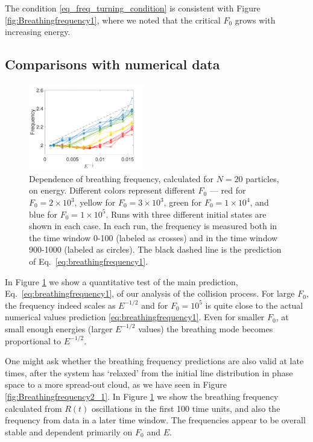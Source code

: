 \documentclass[a4paper, onecolumn]{revtex4-1}
\begin{document}
The condition \eqref{eq_freq_turning_condition} is consistent with Figure
\ref{fig:Breathingfrequency1}, where we noted that the critical $F_0$ grows with increasing energy.


\subsection{Comparisons with numerical data}


\begin{figure}[tb]
\centering
\includegraphics[width=0.45\textwidth]{N_20_freq_vs_E_a.pdf}
\caption{Dependence of breathing frequency, calculated for $N=20$ particles, on energy.  Different
  colors represent different $F_0$ --- red for $F_0=2\times10^3$, yellow for $F_0=3\times10^3$,
  green for $F_0=1\times10^4$, and blue for $F_0=1\times10^5$.  Runs with three different initial
  states are shown in each case.  In each run, the frequency is measured both in the time window
  0-100 (labeled as crosses) and in the time window 900-1000 (labeled as circles). The black dashed
  line is the prediction of Eq.~\eqref{eq:breathingfrequency1}.}
\label{fig:Breathingfrequency4}
\end{figure}


In Figure \ref{fig:Breathingfrequency4} we show a quantitative test of the main prediction,
Eq.~\eqref{eq:breathingfrequency1}, of our analysis of the collision process.  For large $F_0$, the
frequency indeed scales as $E^{-1/2}$ and for $F_0=10^5$ is quite close to the actual numerical
values prediction \eqref{eq:breathingfrequency1}.  Even for smaller $F_0$, at small enough energies
(larger $E^{-1/2}$ values) the breathing mode becomes proportional to $E^{-1/2}$.

One might ask whether the breathing frequency predictions are also valid at late times, after the
system has `relaxed' from the initial line distribution in phase space to a more spread-out cloud,
as we have seen in Figure \ref{fig:Breathingfrequency2_1}.  In Figure \ref{fig:Breathingfrequency4}
we show the breathing frequency calculated from $R(t)$ oscillations in the first 100 time units, and
also the frequency from data in a later time window. The frequencies appear to be overall stable and
dependent primarily on $F_0$ and $E$.
\end{document}
